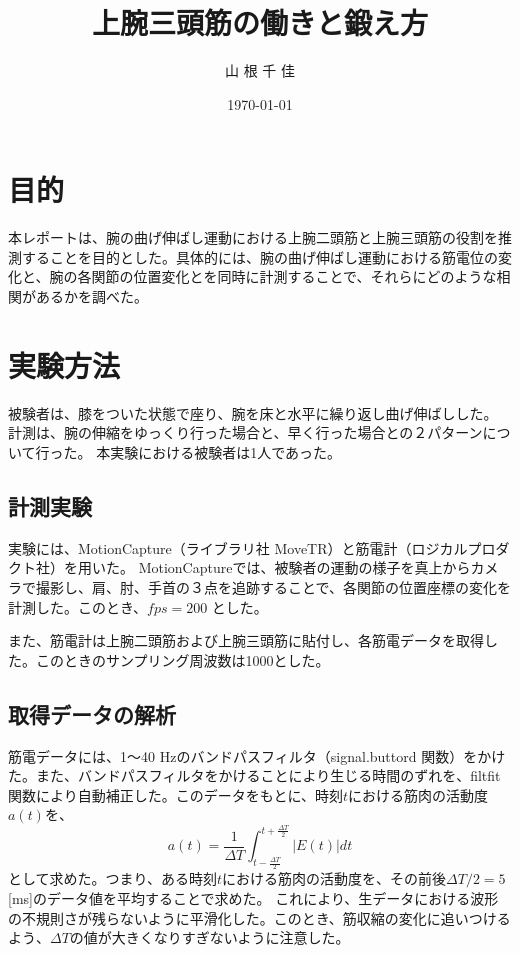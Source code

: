 \documentclass{jsarticle}
\title{上腕三頭筋の働きと鍛え方}
\date{\today}
\author{山 根 千 佳}
\begin{document}
%

\maketitle


\section{目的}
本レポートは、腕の曲げ伸ばし運動における上腕二頭筋と上腕三頭筋の役割を推測することを目的とした。具体的には、腕の曲げ伸ばし運動における筋電位の変化と、腕の各関節の位置変化とを同時に計測することで、それらにどのような相関があるかを調べた。

\section{実験方法}
被験者は、膝をついた状態で座り、腕を床と水平に繰り返し曲げ伸ばしした。
計測は、腕の伸縮をゆっくり行った場合と、早く行った場合との２パターンについて行った。
本実験における被験者は1人であった。

\subsection{計測実験}
実験には、MotionCapture（ライブラリ社 MoveTR）と筋電計（ロジカルプロダクト社）を用いた。
MotionCaptureでは、被験者の運動の様子を真上からカメラで撮影し、肩、肘、手首の３点を追跡することで、各関節の位置座標の変化を計測した。このとき、$fps = 200$ とした。

また、筋電計は上腕二頭筋および上腕三頭筋に貼付し、各筋電データを取得した。このときのサンプリング周波数は1000とした。

\subsection{取得データの解析}
筋電データには、1〜40 Hzのバンドパスフィルタ（signal.buttord 関数）をかけた。また、バンドパスフィルタをかけることにより生じる時間のずれを、filtfit 関数により自動補正した。このデータをもとに、時刻$t$における筋肉の活動度$a(t)$を、
$$a(t) = \frac{1}{\Delta T} \int_{t-\frac{\Delta T}{2}}^{t+\frac{\Delta T}{2}} |E(t)|dt $$
として求めた。つまり、ある時刻$t$における筋肉の活動度を、その前後$\Delta T/2 = 5$ [ms]のデータ値を平均することで求めた。
これにより、生データにおける波形の不規則さが残らないように平滑化した。このとき、筋収縮の変化に追いつけるよう、$\Delta T$の値が大きくなりすぎないように注意した。
\end{document}

